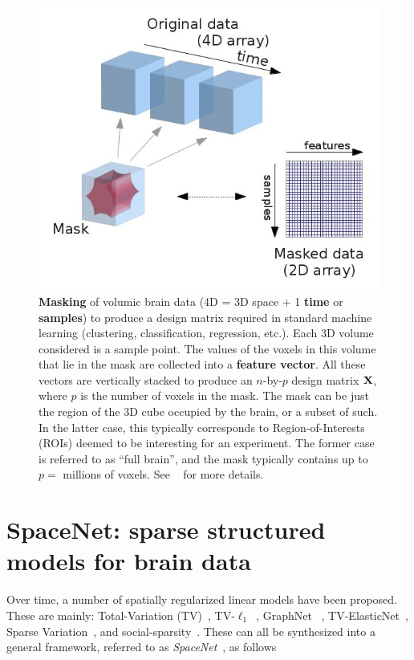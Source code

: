   \begin{figure}[!htb] 
  \includegraphics[width=1\linewidth]{figures/masking.jpg}
  \caption{\textbf{Masking} of volumic brain data (4D = 3D space + 1 \textbf{time} or \textbf{samples})
    to produce a design matrix required in standard machine learning (clustering, classification, regression, etc.). Each 3D volume considered is a sample point. The values of the voxels in this volume that lie in the mask are collected into a \textbf{feature vector}. All these vectors are vertically stacked to produce an $n$-by-$p$ design matrix $\mathbf{X}$, where $p$ is the number of voxels in the mask. The mask can be just the region of the 3D cube occupied by the brain, or a subset of such. In the latter case, this typically corresponds to Region-of-Interests (ROIs) deemed to be interesting for an experiment. The former case is referred to as ``full brain'', and the mask typically contains up to $p = $ millions of voxels. See ~\citep{abraham2014machine} for more details.}
  \label{fig:masking}
\end{figure}

\section{SpaceNet: sparse structured models for brain data}
Over time, a number of spatially regularized linear models have been proposed. These are mainly: Total-Variation (TV)~\citep{michel2011tv}, TV-$\ell_1$~\citep{baldassarre2012,gramfort2013}, GraphNet  ~\citep{grosenick2013,hebiri2011},
TV-ElasticNet~\citep{dubois2014predictive}, Sparse Variation~\citep{eickenberg2015total}, and social-sparsity~\citep{kowalski2013social,varoquaux2016social}. These can all be synthesized into a general framework, referred to as \textit{SpaceNet}~\citep{spacenetohbm}, as follows

